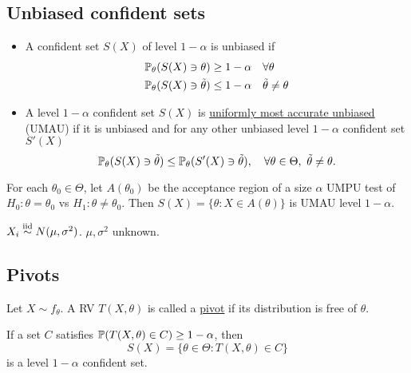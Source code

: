 \subsection{Unbiased confident sets}
\begin{mydef}\textbf{ }
	\begin{itemize}
		\item A confident set $S(X)$ of level $1-\alpha$ is unbiased if 
		\begin{align*}
		\mathbb{P}_\theta(S(X) \ni \theta) &\geq 1 -\alpha \quad \forall \theta \\
		\mathbb{P}_\theta(S(X) \ni \tilde{\theta}) &\leq 1 -\alpha \quad \tilde{\theta} \neq \theta 
		\end{align*}
		
		\item A level $1-\alpha$ confident set $S(X)$ is \uline{uniformly most accurate unbiased} (UMAU) if it is unbiased and for any other unbiased level $1-\alpha$ confident set $S'(X)$
		$$\PP_\theta (S(X) \ni \tilde{\theta}) \leq \PP_\theta(S'(X) \ni \tilde{\theta}),\quad \forall \theta\in \Theta,\ \tilde{\theta} \neq \theta.$$
	\end{itemize}
\end{mydef}

\begin{thm}
	For each $\theta_0 \in \Theta$, let $A(\theta_0)$ be the acceptance region of a size $\alpha$ UMPU test of $H_0:\theta=\theta_0$ vs $H_1: \theta \neq \theta_0$. Then $S(X) = \{ \theta: X\in A(\theta) \}$ is UMAU level $1-\alpha$. 
\end{thm}

\begin{exap}
	$X_i \stackrel{\text{iid}}{\sim} N(\mu,\sigma^2)$. $\mu,\sigma^2$ unknown.
\end{exap}

\subsection{Pivots}
\begin{mydef}
	Let $X \sim f_\theta$. A RV $T(X, \theta)$ is called a \uline{pivot} if its distribution is free of $\theta$. 
\end{mydef}

\begin{thm}
	If a set $C$ satisfies $\mathbb{P}(T(X,\theta) \in C)\geq 1-\alpha$, then 
	$$S(X) = \{ \theta \in \Theta: T(X,\theta) \in C \}$$
	is a level $1-\alpha$ confident set.
\end{thm}
 
